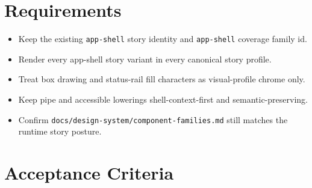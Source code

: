 \section{Requirements}\label{record-104-requirements}

\begin{itemize}
\tightlist
\item
  Keep the existing \texttt{a\allowbreak{}p\allowbreak{}p\allowbreak{}-\allowbreak{}s\allowbreak{}h\allowbreak{}e\allowbreak{}l\allowbreak{}l} story identity and \texttt{a\allowbreak{}p\allowbreak{}p\allowbreak{}-\allowbreak{}s\allowbreak{}h\allowbreak{}e\allowbreak{}l\allowbreak{}l} coverage family id.
\item
  Render every app-shell story variant in every canonical story profile.
\item
  Treat box drawing and status-rail fill characters as visual-profile chrome only.
\item
  Keep pipe and accessible lowerings shell-context-first and semantic-preserving.
\item
  Confirm \texttt{d\allowbreak{}o\allowbreak{}c\allowbreak{}s\allowbreak{}/\allowbreak{}d\allowbreak{}e\allowbreak{}s\allowbreak{}i\allowbreak{}g\allowbreak{}n\allowbreak{}-\allowbreak{}s\allowbreak{}y\allowbreak{}s\allowbreak{}t\allowbreak{}e\allowbreak{}m\allowbreak{}/\allowbreak{}c\allowbreak{}o\allowbreak{}m\allowbreak{}p\allowbreak{}o\allowbreak{}n\allowbreak{}e\allowbreak{}n\allowbreak{}t\allowbreak{}-\allowbreak{}f\allowbreak{}a\allowbreak{}m\allowbreak{}i\allowbreak{}l\allowbreak{}i\allowbreak{}e\allowbreak{}s\allowbreak{}.\allowbreak{}m\allowbreak{}d} still matches the runtime story posture.
\end{itemize}

\section{Acceptance Criteria}\label{record-104-acceptance-criteria}

